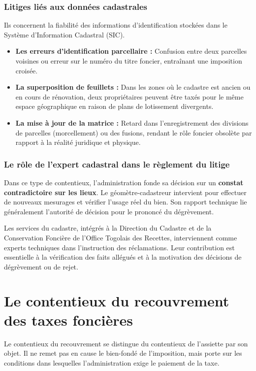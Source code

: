 \documentclass[Cours_contentieuxTF2026.tex]{subfiles}
\begin{document}
\subsubsection{Litiges liés aux données cadastrales}
Ils concernent la fiabilité des informations d'identification stockées dans le Système d'Information Cadastral (SIC).

\begin{itemize}
	\item \textbf{Les erreurs d'identification parcellaire :} Confusion entre deux parcelles voisines ou erreur sur le numéro du titre foncier, entraînant une imposition croisée.
	
	\item \textbf{La superposition de feuillets :} Dans les zones où le cadastre est ancien ou en cours de rénovation, deux propriétaires peuvent être taxés pour le même espace géographique en raison de plans de lotissement divergents.
	
	\item \textbf{La mise à jour de la matrice :} Retard dans l'enregistrement des divisions de parcelles (morcellement) ou des fusions, rendant le rôle foncier obsolète par rapport à la réalité juridique et physique.
\end{itemize}

\subsubsection{Le rôle de l'expert cadastral dans le règlement du litige}
Dans ce type de contentieux, l'administration fonde sa décision sur un \textbf{constat contradictoire sur les lieux}. Le géomètre-cadastreur intervient pour effectuer de nouveaux mesurages et vérifier l'usage réel du bien. Son rapport technique lie généralement l'autorité de décision pour le prononcé du dégrèvement.


Les services du cadastre, intégrés à la Direction du Cadastre et de la Conservation
Foncière de l’Office Togolais des Recettes, interviennent comme experts techniques
dans l’instruction des réclamations. Leur contribution est essentielle à la
vérification des faits allégués et à la motivation des décisions de dégrèvement ou de
rejet.

\section{Le contentieux du recouvrement des taxes foncières}

Le contentieux du recouvrement se distingue du contentieux de l’assiette par son
objet. Il ne remet pas en cause le bien-fondé de l’imposition, mais porte sur les
conditions dans lesquelles l’administration exige le paiement de la taxe.
\end{document}
